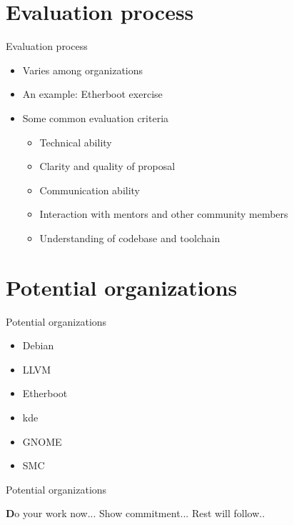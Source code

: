 \documentclass{beamer}
\begin{document}
\section{Evaluation process}
\begin{frame}{Evaluation process}
\begin{itemize}
\item Varies among organizations
\pause
\item An example: Etherboot exercise
\pause
\item Some common evaluation criteria
  \begin{itemize}
\pause
  \item Technical ability
\pause
  \item Clarity and quality of proposal
\pause
  \item Communication ability
\pause
  \item Interaction with mentors and other community members
\pause
  \item Understanding of codebase and toolchain
  \end{itemize}
\end{itemize}
\end{frame}

\section{Potential organizations}
\begin{frame}{Potential organizations}
\begin{itemize}
\item Debian
\item LLVM
\item Etherboot
\item kde
\item GNOME
\item SMC
\end{itemize}
\end{frame}

\begin{frame}{Potential organizations}
\begin{block}
{\textbf Do your work now...
Show commitment...
Rest will follow..}
\end{block}
\end{frame}
\end{document}
